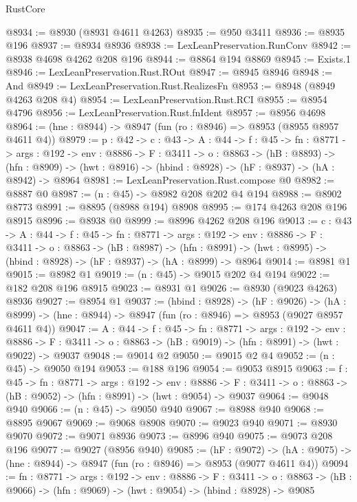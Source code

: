 \begin{lexlean}{RustCore}
\begin{coremodule}
@8934 := @8930 (@8931 @4611 @4263)
@8935 := @950 @3411
@8936 := @8935 @196
@8937 := @8934 @8936
@8938 := LexLeanPreservation.RunConv
@8942 := @8938 @4698 @4262 @208 @196
@8944 := @8864 @194 @8869
@8945 := Exists.{1}
@8946 := LexLeanPreservation.Rust.ROut
@8947 := @8945 @8946
@8948 := And
@8949 := LexLeanPreservation.Rust.RealizesFn
@8953 := @8948 (@8949 @4263 @208 @4)
@8954 := LexLeanPreservation.Rust.RCI
@8955 := @8954 @4796
@8956 := LexLeanPreservation.Rust.fnIdent
@8957 := @8956 @4698
@8964 := (hne : @8944) -> @8947 (fun (ro : @8946) => @8953 (@8955 @8957 @4611 @4))
@8979 := {p : @42} ->
  {c : @43} ->
  {A : @44} ->
  {f : @45} ->
  {fn : @8771} ->
  {args : @192} ->
  {env : @8886} ->
  {F : @3411} ->
  {o : @8863} ->
  (hB : @8893) ->
  (hfn : @8909) -> (hwt : @8916) -> (hbind : @8928) -> (hF : @8937) -> (hA : @8942) -> @8964
@8981 := LexLeanPreservation.Rust.compose @0
@8982 := @8887 @0
@8987 := (n : @45) -> @8982 @208 @202 @4 @194
@8988 := @8902 @8773
@8991 := @8895 (@8988 @194) @8908
@8995 := @174 @4263 @208 @196 @8915
@8996 := @8938 @0
@8999 := @8996 @4262 @208 @196
@9013 := {c : @43} ->
  {A : @44} ->
  {f : @45} ->
  {fn : @8771} ->
  {args : @192} ->
  {env : @8886} ->
  {F : @3411} ->
  {o : @8863} ->
  (hB : @8987) ->
  (hfn : @8991) -> (hwt : @8995) -> (hbind : @8928) -> (hF : @8937) -> (hA : @8999) -> @8964
@9014 := @8981 @1
@9015 := @8982 @1
@9019 := (n : @45) -> @9015 @202 @4 @194
@9022 := @182 @208 @196 @8915
@9023 := @8931 @1
@9026 := @8930 (@9023 @4263) @8936
@9027 := @8954 @1
@9037 := (hbind : @8928) ->
  (hF : @9026) ->
  (hA : @8999) -> (hne : @8944) -> @8947 (fun (ro : @8946) => @8953 (@9027 @8957 @4611 @4))
@9047 := {A : @44} ->
  {f : @45} ->
  {fn : @8771} ->
  {args : @192} ->
  {env : @8886} ->
  {F : @3411} -> {o : @8863} -> (hB : @9019) -> (hfn : @8991) -> (hwt : @9022) -> @9037
@9048 := @9014 @2
@9050 := @9015 @2 @4
@9052 := (n : @45) -> @9050 @194
@9053 := @188 @196
@9054 := @9053 @8915
@9063 := {f : @45} ->
  {fn : @8771} ->
  {args : @192} ->
  {env : @8886} ->
  {F : @3411} -> {o : @8863} -> (hB : @9052) -> (hfn : @8991) -> (hwt : @9054) -> @9037
@9064 := @9048 @940
@9066 := (n : @45) -> @9050 @940
@9067 := @8988 @940
@9068 := @8895 @9067
@9069 := @9068 @8908
@9070 := @9023 @940
@9071 := @8930 @9070
@9072 := @9071 @8936
@9073 := @8996 @940
@9075 := @9073 @208 @196
@9077 := @9027 (@8956 @940)
@9085 := (hF : @9072) ->
  (hA : @9075) -> (hne : @8944) -> @8947 (fun (ro : @8946) => @8953 (@9077 @4611 @4))
@9094 := {fn : @8771} ->
  {args : @192} ->
  {env : @8886} ->
  {F : @3411} ->
  {o : @8863} -> (hB : @9066) -> (hfn : @9069) -> (hwt : @9054) -> (hbind : @8928) -> @9085

\end{coremodule}
\end{lexlean}
